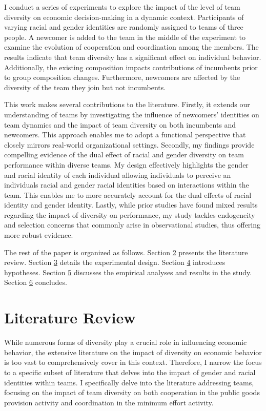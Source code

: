  I conduct a series of experiments to explore the impact of the level of team diversity on economic decision-making in a dynamic context.  Participants of varying racial and gender identities are randomly assigned to teams of three people. A newcomer is added to the team in the middle of the experiment to examine the evolution of cooperation and coordination among the members. The results indicate that team diversity has a significant effect on individual behavior. Additionally, the existing composition impacts contributions of incumbents prior to group composition changes. Furthermore, newcomers are affected by the diversity of the team they join but not incumbents. 

\hspace *{0mm} This work makes several contributions to the literature. Firstly, it extends our understanding of teams by investigating the influence of newcomers' identities on team dynamics and the impact of team diversity on both incumbents and newcomers. This approach enables me to adopt a functional perspective that closely mirrors real-world organizational settings. Secondly, my findings provide compelling evidence of the dual effect of racial and gender diversity on team performance within diverse teams. My design effectively highlights the gender and racial identity of each individual allowing individuals to perceive an individuals racial and gender racial identities based on interactions within the team. This enables me to more accurately account for the dual effects of racial identity and gender identity. Lastly, while prior studies have found mixed results regarding the impact of diversity on performance, my study tackles endogeneity and selection concerns that commonly arise in observational studies, thus offering more robust evidence.

\hspace *{0mm} The rest of the paper is organized as follows. Section \hyperref[sec:literature]{2} presents the literature review. Section \hyperref[sec:Design]{3} details the experimental design. Section \hyperref[sec:Hypotheses]{4} introduces hypotheses. Section \hyperref[sec:Analysis]{5} discusses the empirical analyses and results in the study. Section \hyperref[sec:Conclusion]{6} concludes.
 

\section{Literature Review} \label{sec:literature}
 
While numerous forms of diversity play a crucial role in influencing economic behavior, the extensive literature on the impact of diversity on economic behavior is too vast to comprehensively cover in this context. Therefore, I narrow the focus to a specific subset of literature that delves into the impact of gender and racial identities within teams. I specifically delve into the literature addressing teams, focusing on the impact of team diversity on both cooperation in the public goods provision activity and coordination in the minimum effort activity.

